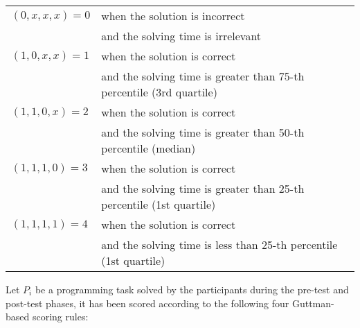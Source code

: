\begin{center}\scriptsize
\begin{tabular}{ll}
$(0,x,x,x) = 0$ & when the solution is incorrect\\
 & and the solving time is irrelevant\\
$(1,0,x,x) = 1$ & when the solution is correct\\
& and the solving time is greater than 75-th percentile (3rd quartile)\\
$(1,1,0,x) = 2$ & when the solution is correct\\
& and the solving time is greater than 50-th percentile (median)\\
$(1,1,1,0) = 3$ & when the solution is correct\\
 & and the solving time is greater than 25-th percentile (1st quartile)\\
$(1,1,1,1) = 4$ & when the solution is correct\\
 & and the solving time is less than 25-th percentile (1st quartile)\\
\end{tabular}
\end{center}

Let $P_{i}$ be a programming task solved by the participants during the pre-test and post-test phases, it has been scored according to the following four Guttman-based scoring rules: 


